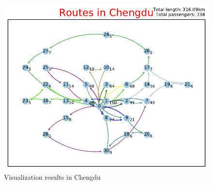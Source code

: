 \documentclass{llncs}
\begin{document}
\begin{figure}[h]
{\begin{minipage}[t]{0.32\textwidth}
				\centering
				\includegraphics[width=\textwidth]{CVRP_chengdu_100_30.pdf}
		\end{minipage}}
		\caption{Visualization results in Chengdu}\label{opt_chengdu}
	\end{figure}
\end{document}
